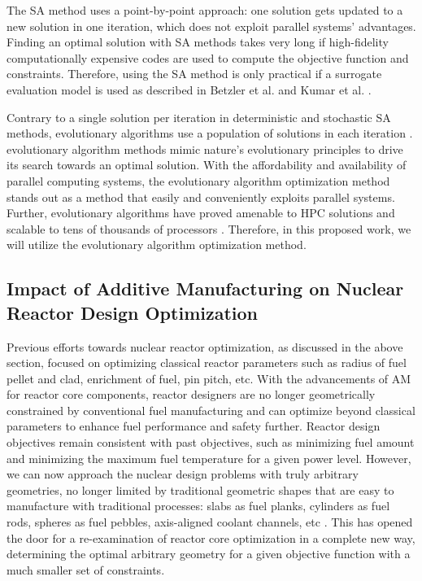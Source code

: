 The \gls{SA} method uses a point-by-point approach:
one solution gets updated to a new solution in one iteration, which does not 
exploit parallel systems' advantages.
Finding an optimal solution with \gls{SA} methods takes very 
long if high-fidelity computationally expensive codes are used to compute 
the objective function and constraints.
Therefore, using the \gls{SA} method is only practical if a 
surrogate evaluation model is used as described in Betzler et al. 
\cite{betzler_design_2019} and Kumar et al. \cite{kumar_new_2015}.

Contrary to a single solution per iteration in deterministic and stochastic 
\gls{SA} methods, evolutionary algorithms use a population of solutions in each 
iteration \cite{deb_multi-objective_2001}. 
evolutionary algorithm methods mimic nature's evolutionary principles to drive 
its search towards an optimal solution. 
With the affordability and availability of parallel computing systems, the 
evolutionary algorithm optimization method stands out as a method 
that easily and conveniently exploits parallel systems. 
Further, evolutionary algorithms have proved amenable to \gls{HPC} solutions and 
scalable to tens of thousands of processors \cite{kropaczek_constraint_2019}. 
Therefore, in this proposed work, we will utilize the evolutionary algorithm 
optimization method. 

\subsection{Impact of Additive Manufacturing on Nuclear Reactor Design 
Optimization}
Previous efforts towards nuclear reactor optimization, as discussed in the above 
section, focused on optimizing classical reactor parameters such as 
radius of fuel pellet and clad, enrichment of fuel, pin pitch, etc. 
With the advancements of \gls{AM} for reactor core components, reactor designers 
are no longer geometrically constrained by conventional fuel manufacturing and 
can optimize beyond classical parameters to enhance fuel performance and safety 
further. 
Reactor design objectives remain consistent with past objectives, such as 
minimizing fuel amount and minimizing the maximum fuel temperature for a given 
power level.
However, we can now approach the nuclear design problems with truly arbitrary 
geometries, no longer limited by traditional geometric shapes that are 
easy to manufacture with traditional processes: slabs as fuel planks, cylinders 
as fuel rods, spheres as fuel pebbles, axis-aligned coolant channels, etc  
\cite{sobes_artificial_2020}.
This has opened the door for a re-examination of reactor core 
optimization in a complete new way, determining the optimal arbitrary geometry 
for a given objective function \cite{sobes_artificial_2020} with a much smaller 
set of constraints. 

